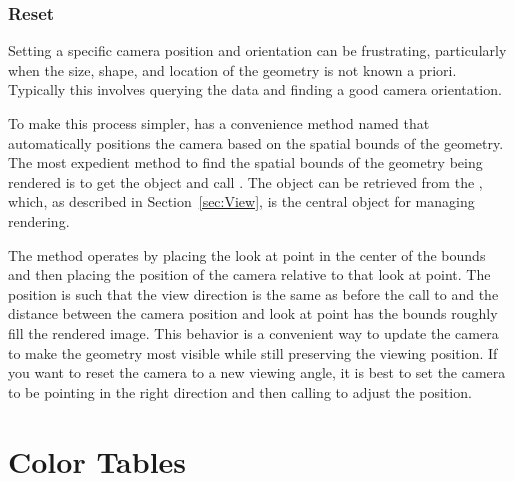 



\subsubsection{Reset}


Setting a specific camera position and orientation can be frustrating,
particularly when the size, shape, and location of the geometry is not
known a priori. Typically this involves querying the data and finding a
good camera orientation.

To make this process simpler,  has a convenience
method named  that automatically positions the
camera based on the spatial bounds of the geometry. The most expedient
method to find the spatial bounds of the geometry being rendered is to get
the  object and call . The
 object can be retrieved from the
, which, as described in Section~\ref{sec:View}, is the
central object for managing rendering.


The  method operates by placing the look at point
in the center of the bounds and then placing the position of the camera
relative to that look at point. The position is such that the view
direction is the same as before the call to  and
the distance between the camera position and look at point has the bounds
roughly fill the rendered image. This behavior is a convenient way to
update the camera to make the geometry most visible while still preserving
the viewing position. If you want to reset the camera to a new viewing
angle, it is best to set the camera to be pointing in the right direction
and then calling  to adjust the position.




\section{Color Tables}
\label{sec:ColorTables}


